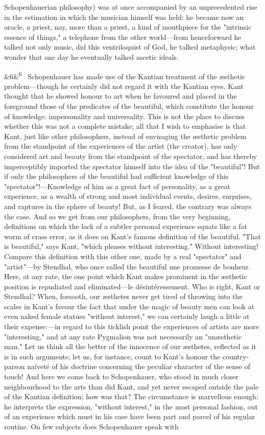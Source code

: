 \documentclass[12pt]{article}
\newcommand{\para}[1][]{\par\noindent\ifx&#1&\else\textsuperscript{\footnotesize #1}~\fi}
\begin{document}
Schopenhauerian philosophy) was at once accompanied by an unprecedented rise in the estimation in which the musician himself was held: he became now an oracle, a priest, nay, more than a priest, a kind of mouthpiece for the "intrinsic essence of things," a telephone from the other world---from henceforward he talked not only music, did this ventriloquist of God, he talked metaphysic; what wonder that one day he eventually talked ascetic ideals.

\para[6] Schopenhauer has made use of the Kantian treatment of the æsthetic problem---though he certainly did not regard it with the Kantian eyes. Kant thought that he showed honour to art when he favoured and placed in the foreground those of the predicates of the beautiful, which constitute the honour of knowledge: impersonality and universality. This is not the place to discuss whether this was not a complete mistake; all that I wish to emphasise is that Kant, just like other philosophers, instead of envisaging the æsthetic problem from the standpoint of the experiences of the artist (the creator), has only considered art and beauty from the standpoint of the spectator, and has thereby imperceptibly imported the spectator himself into the idea of the "beautiful"! But if only the philosophers of the beautiful had sufficient knowledge of this "spectator"!---Knowledge of him as a great fact of personality, as a great experience, as a wealth of strong and most individual events, desires, surprises, and raptures in the sphere of beauty! But, as I feared, the contrary was always the case. And so we get from our philosophers, from the very beginning, definitions on which the lack of a subtler personal experience squats like a fat worm of crass error, as it does on Kant's famous definition of the beautiful. "That is beautiful," says Kant, "which pleases without interesting." Without interesting! Compare this definition with this other one, made by a real "spectator" and "artist"---by Stendhal, who once called the beautiful une promesse de bonheur. Here, at any rate, the one point which Kant makes prominent in the æsthetic position is repudiated and eliminated---le désintéressement. Who is right, Kant or Stendhal? When, forsooth, our æsthetes never get tired of throwing into the scales in Kant's favour the fact that under the magic of beauty men can look at even naked female statues "without interest," we can certainly laugh a little at their expense:---in regard to this ticklish point the experiences of artists are more "interesting," and at any rate Pygmalion was not necessarily an "unæsthetic man." Let us think all the better of the innocence of our æsthetes, reflected as it is in such arguments; let us, for instance, count to Kant's honour the country-parson naïveté of his doctrine concerning the peculiar character of the sense of touch! And here we come back to Schopenhauer, who stood in much closer neighbourhood to the arts than did Kant, and yet never escaped outside the pale of the Kantian definition; how was that? The circumstance is marvellous enough: he interprets the expression, "without interest," in the most personal fashion, out of an experience which must in his case have been part and parcel of his regular routine. On few subjects does Schopenhauer speak with 
\end{document}
